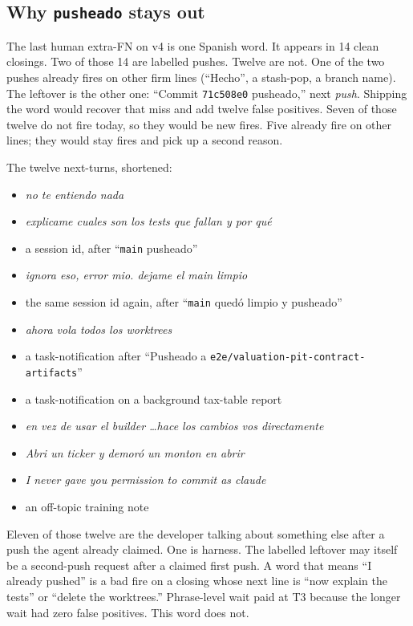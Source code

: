 \subsection{Why \texttt{pusheado} stays out}
\label{sec:pusheado}

The last human extra-FN on v4 is one Spanish word. It appears in 14
clean closings. Two of those 14 are labelled pushes. Twelve are
not. One of the two pushes already fires on other firm lines
(``Hecho'', a stash-pop, a branch name). The leftover is the other
one: ``Commit \texttt{71c508e0} pusheado,'' next \emph{push}.
Shipping the word would recover that miss and add twelve false
positives. Seven of those twelve do not fire today, so they would
be new fires. Five already fire on other lines; they would stay
fires and pick up a second reason.

The twelve next-turns, shortened:

\begin{itemize}
\item \emph{no te entiendo nada}
\item \emph{explicame cuales son los tests que fallan y por qu\'e}
\item a session id, after ``\texttt{main} pusheado''
\item \emph{ignora eso, error mio. dejame el main limpio}
\item the same session id again, after ``\texttt{main} qued\'o
limpio y pusheado''
\item \emph{ahora vola todos los worktrees}
\item a task-notification after ``Pusheado a
\texttt{e2e/valuation-pit-contract-artifacts}''
\item a task-notification on a background tax-table report
\item \emph{en vez de usar el builder \ldots hace los cambios vos
directamente}
\item \emph{Abri un ticker y demor\'o un monton en abrir}
\item \emph{I never gave you permission to commit as claude}
\item an off-topic training note
\end{itemize}

Eleven of those twelve are the developer talking about something
else after a push the agent already claimed. One is harness. The
labelled leftover may itself be a second-push request after a
claimed first push. A word that means ``I already pushed'' is a
bad fire on a closing whose next line is ``now explain the tests''
or ``delete the worktrees.'' Phrase-level wait paid at T3 because
the longer wait had zero false positives. This word does not.

